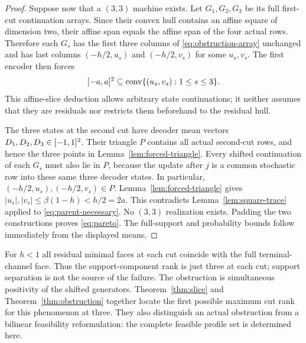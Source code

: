 \begin{proof}
Suppose now that a $(3,3)$ machine exists. Let $G_1,G_2,G_3$ be its
full first-cut continuation arrays. Since their convex hull contains
an affine square of dimension two, their affine span equals the affine
span of the four actual rows. Therefore each $G_s$ has the first three
columns of \eqref{eq:obstruction-array} unchanged and has last columns
$(-h/2,u_s)$ and $(-h/2,v_s)$ for some $u_s,v_s$. The first encoder
then forces
\begin{equation}\label{eq:parent-necessary}
 [-a,a]^2\subseteq\operatorname{conv}\{(u_s,v_s):1\le s\le3\}.
\end{equation}
This affine-slice deduction allows arbitrary state continuations; it
neither assumes that they are residuals nor restricts them beforehand
to the residual hull.

The three states at the second cut have decoder mean vectors
$D_1,D_2,D_3\in[-1,1]^2$. Their triangle $P$ contains all actual
second-cut rows, and hence the three points in
Lemma~\ref{lem:forced-triangle}. Every shifted continuation of each
$G_s$ must also lie in $P$, because the update after $j$ is a common
stochastic row into these same three decoder states. In particular,
$(-h/2,u_s),(-h/2,v_s)\in P$. Lemma~\ref{lem:forced-triangle} gives
$|u_s|,|v_s|\le\beta(1-h)<h/2=2a$. This contradicts
Lemma~\ref{lem:square-trace} applied to \eqref{eq:parent-necessary}.
No $(3,3)$ realization exists. Padding the two constructions proves
\eqref{eq:pareto}. The full-support and probability bounds follow
immediately from the displayed means.
\end{proof}

For $h<1$ all residual minimal faces at each cut coincide with the full
terminal-channel face. Thus the support-component rank is just three
at each cut; support separation is not the source of the failure. The
obstruction is simultaneous positivity of the shifted generators.
Theorem~\ref{thm:slice} and Theorem~\ref{thm:obstruction} together locate
the first possible maximum cut rank for this phenomenon at three.
They also distinguish an actual obstruction from a bilinear feasibility
reformulation: the complete feasible profile set is determined here.
